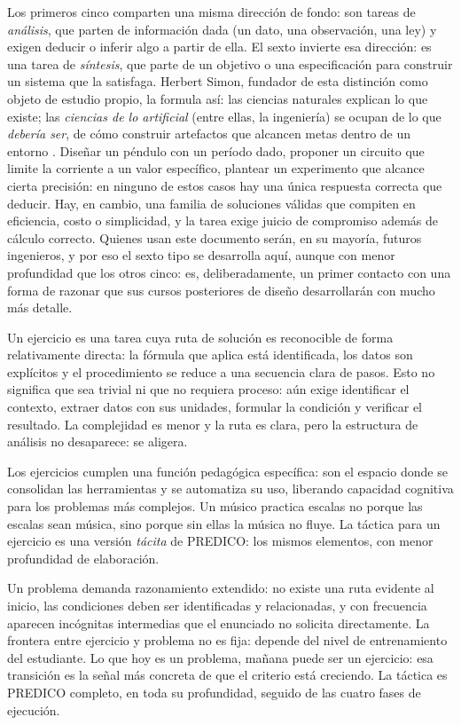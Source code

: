 \documentclass[11pt]{book}
\begin{document}
\medskip
Los primeros cinco comparten una misma dirección de fondo: son tareas de {\it análisis}, que parten de información dada (un dato, una observación, una ley) y exigen deducir o inferir algo a partir de ella. El sexto invierte esa dirección: es una tarea de {\it síntesis}, que parte de un objetivo o una especificación para construir un sistema que la satisfaga. Herbert Simon, fundador de esta distinción como objeto de estudio propio, la formula así: las ciencias naturales explican lo que existe; las {\it ciencias de lo artificial} (entre ellas, la ingeniería) se ocupan de lo que {\it debería ser}, de cómo construir artefactos que alcancen metas dentro de un entorno \cite{Simon1996}. Diseñar un péndulo con un período dado, proponer un circuito que limite la corriente a un valor específico, plantear un experimento que alcance cierta precisión: en ninguno de estos casos hay una única respuesta correcta que deducir. Hay, en cambio, una familia de soluciones válidas que compiten en eficiencia, costo o simplicidad, y la tarea exige juicio de compromiso además de cálculo correcto. Quienes usan este documento serán, en su mayoría, futuros ingenieros, y por eso el sexto tipo se desarrolla aquí, aunque con menor profundidad que los otros cinco: es, deliberadamente, un primer contacto con una forma de razonar que sus cursos posteriores de diseño desarrollarán con mucho más detalle.

\medskip
{}
Un ejercicio es una tarea cuya ruta de solución es reconocible de forma relativamente directa: la fórmula que aplica está identificada, los datos son explícitos y el procedimiento se reduce a una secuencia clara de pasos. Esto no significa que sea trivial ni que no requiera proceso: aún exige identificar el contexto, extraer datos con sus unidades, formular la condición y verificar el resultado. La complejidad es menor y la ruta es clara, pero la estructura de análisis no desaparece: se aligera.

Los ejercicios cumplen una función pedagógica específica: son el espacio donde se consolidan las herramientas y se automatiza su uso, liberando capacidad cognitiva para los problemas más complejos. Un músico practica escalas no porque las escalas sean música, sino porque sin ellas la música no fluye. La táctica para un ejercicio es una versión {\it tácita} de PREDICO: los mismos elementos, con menor profundidad de elaboración.

\medskip
{}
Un problema demanda razonamiento extendido: no existe una ruta evidente al inicio, las condiciones deben ser identificadas y relacionadas, y con frecuencia aparecen incógnitas intermedias que el enunciado no solicita directamente. La frontera entre ejercicio y problema no es fija: depende del nivel de entrenamiento del estudiante. Lo que hoy es un problema, mañana puede ser un ejercicio: esa transición es la señal más concreta de que el criterio está creciendo. La táctica es PREDICO completo, en toda su profundidad, seguido de las cuatro fases de ejecución.
\end{document}
